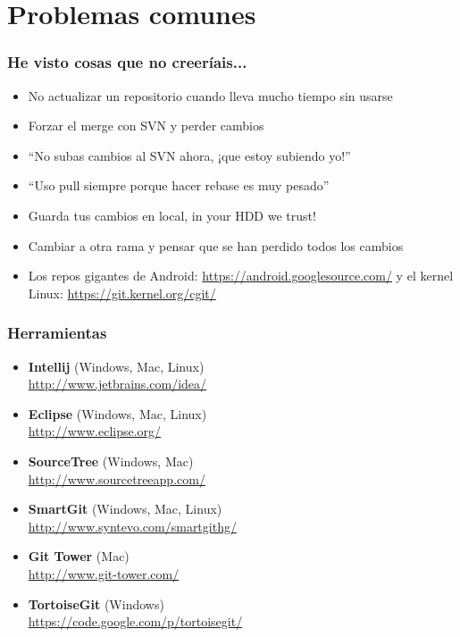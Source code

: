 \section{Problemas comunes}
\frame
{
\frametitle{He visto cosas que no creeríais...}
\begin{itemize}
\item No actualizar un repositorio cuando lleva mucho tiempo sin usarse
\item Forzar el merge con SVN y perder cambios
\item ``No subas cambios al SVN ahora, ¡que estoy subiendo yo!''
\item ``Uso pull siempre porque hacer rebase es muy pesado''
\item Guarda tus cambios en local, in your HDD we trust!
\item Cambiar a otra rama y pensar que se han perdido todos los cambios
\item Los repos gigantes de Android: \url{https://android.googlesource.com/} y el kernel Linux: \url{https://git.kernel.org/cgit/}
\end{itemize}
}

\usebackgroundtemplate{}
\frame
{
\frametitle{Herramientas}
\begin{itemize}
 \item \textbf{Intellij} (Windows, Mac, Linux)\\ \url{http://www.jetbrains.com/idea/}
 \item \textbf{Eclipse} (Windows, Mac, Linux)\\ \url{http://www.eclipse.org/}
 \item \textbf{SourceTree} (Windows, Mac)\\ \url{http://www.sourcetreeapp.com/}
 \item \textbf{SmartGit} (Windows, Mac, Linux)\\ \url{http://www.syntevo.com/smartgithg/}
 \item \textbf{Git Tower} (Mac)\\ \url{http://www.git-tower.com/}
 \item \textbf{TortoiseGit} (Windows)\\ \url{https://code.google.com/p/tortoisegit/}
\end{itemize}
}